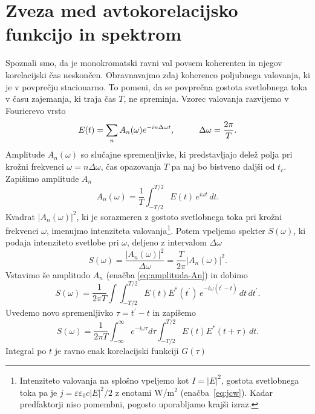 \section{Zveza med avtokorelacijsko funkcijo in spektrom}

Spoznali smo, da je monokromatski ravni val povsem koherenten in njegov
korelacijski čas neskončen. Obravnavajmo zdaj koherenco poljubnega valovanja, ki
je v povprečju stacionarno. To pomeni, da se povprečna gostota svetlobnega
toka v času zajemanja, ki traja čas $T$, ne spreminja. Vzorec valovanja razvijemo
v Fourierevo vrsto
\begin{equation}
E(t)=\sum_{n}A_{n}(\omega)e^{-i n \Delta\omega t},\mbox{\hskip1cm}\Delta\omega=\frac{2\pi}{T}.
\end{equation}
Amplitude $A_{n}(\omega)$ so slučajne spremenljivke, ki predstavljajo delež polja pri 
krožni frekvenci $\omega=n\Delta\omega$, čas opazovanja $T$ pa naj bo bistveno daljši od $t_{c}$. 
Zapišimo amplitude $A_n$
\begin{equation}
A_{n}(\omega)=\frac{1}{T}\int_{-T/2}^{T/2}E(t)\, e^{i\omega t}\, dt.\label{eq:amplituda-An}
\end{equation}
Kvadrat $|A_{n}(\omega)|^{2}$, ki je sorazmeren z gostoto svetlobnega toka pri krožni
frekvenci $\omega$, imenujmo intenziteta
valovanja\footnote{Intenziteto valovanja na splošno vpeljemo kot $I = |E|^2$, gostota svetlobnega
toka pa je $j = \varepsilon \varepsilon_0 c |E|^2/2$ z enotami W/m$^2$ (enačba~\ref{eq:jcw}). 
Kadar predfaktorji niso pomembni, pogosto uporabljamo krajši izraz.}. 
Potem vpeljemo 
spekter $S(\omega)$, ki podaja intenziteto svetlobe pri $\omega$,
deljeno z intervalom $\Delta\omega$
\begin{equation}
S(\omega)=\frac{|A_{n}(\omega)|^{2}}{\Delta\omega}=\frac{T}{2\pi}|A_{n}(\omega)|^{2}.
\end{equation}
Vstavimo še amplitudo $A_{n}$ (enačba \ref{eq:amplituda-An}) in dobimo 
\begin{equation}
S(\omega) =\frac{1}{2\pi T}\int\int_{-T/2}^{T/2}E(t)E^{*}(t^{\prime})\, 
e^{-i\omega(t^{\prime}-t)}\, dt\, dt^{\prime}.
\end{equation}
Uvedemo novo spremenljivko $\tau=t^{\prime}-t$ in zapišemo
\begin{equation}
S(\omega)=\frac{1}{2\pi T}\int_{-\infty}^{\infty}e^{-i\omega\tau}d\tau\int_{-T/2}^{T/2}E(t)E^{*}(t+\tau)\, dt.
\label{eq:spekter}
\end{equation}
Integral po $t$ je ravno enak korelacijski funkciji $G(\tau)$ 
